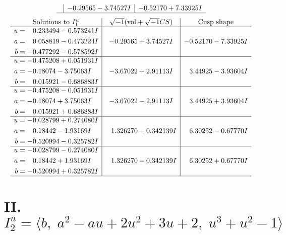 \documentclass[1p]{elsarticle_modified}
\theoremstyle{definition}
\newcommand{\I}{\sqrt{-1}}
\begin{document}
$$\begin{array}{c|c|c}
 & -0.29565 - 3.74527 I & -0.52170 + 7.33925 I\\
 \hline 
 \end{array}$$\newpage$$\begin{array}{c|c|c}  
\text{Solutions to }I^u_{1}& \I (\text{vol} + \sqrt{-1}CS) & \text{Cusp shape}\\
 \hline 
\begin{aligned}
u &= \phantom{-}0.233494 - 0.573241 I \\
a &= \phantom{-}0.058819 - 0.473224 I \\
b &= -0.477292 - 0.578592 I\end{aligned}
 & -0.29565 + 3.74527 I & -0.52170 - 7.33925 I \\ \hline\begin{aligned}
u &= -0.475208 + 0.051931 I \\
a &= -0.18074 - 3.75063 I \\
b &= \phantom{-}0.015921 - 0.686883 I\end{aligned}
 & -3.67022 + 2.91113 I & \phantom{-}3.44925 - 3.93604 I \\ \hline\begin{aligned}
u &= -0.475208 - 0.051931 I \\
a &= -0.18074 + 3.75063 I \\
b &= \phantom{-}0.015921 + 0.686883 I\end{aligned}
 & -3.67022 - 2.91113 I & \phantom{-}3.44925 + 3.93604 I \\ \hline\begin{aligned}
u &= -0.028799 + 0.274080 I \\
a &= \phantom{-}0.18442 - 1.93169 I \\
b &= -0.520994 - 0.325782 I\end{aligned}
 & \phantom{-}1.326270 + 0.342139 I & \phantom{-}6.30252 - 0.67770 I \\ \hline\begin{aligned}
u &= -0.028799 - 0.274080 I \\
a &= \phantom{-}0.18442 + 1.93169 I \\
b &= -0.520994 + 0.325782 I\end{aligned}
 & \phantom{-}1.326270 - 0.342139 I & \phantom{-}6.30252 + 0.67770 I\\
 \hline 
 \end{array}$$\newpage\newpage\renewcommand{\arraystretch}{1}
\centering \section*{II. $I^u_{2}= \langle b,\;a^2- a u+2 u^2+3 u+2,\;u^3+u^2-1 \rangle$}
\end{document}
